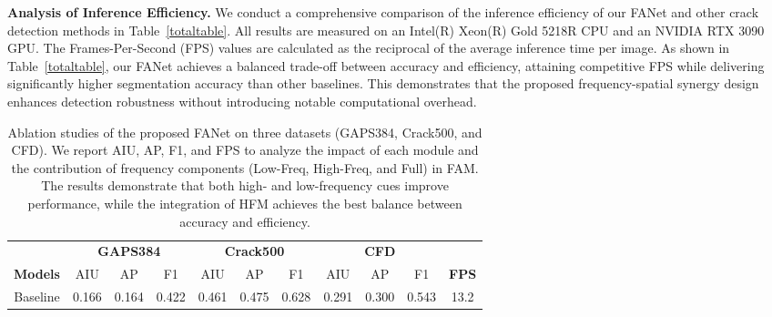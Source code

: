 \documentclass[journal]{IEEEtran}
\begin{document}
\textbf{Analysis of Inference Efficiency.}  
We conduct a comprehensive comparison of the inference efficiency of our FANet and other crack detection methods in Table~\ref{totaltable}.  
All results are measured on an Intel(R) Xeon(R) Gold 5218R CPU and an NVIDIA RTX 3090 GPU.  
The Frames-Per-Second (FPS) values are calculated as the reciprocal of the average inference time per image.  
As shown in Table~\ref{totaltable}, our FANet achieves a balanced trade-off between accuracy and efficiency, attaining competitive FPS while delivering significantly higher segmentation accuracy than other baselines.  
This demonstrates that the proposed frequency-spatial synergy design enhances detection robustness without introducing notable computational overhead.




\begin{table}[]
\centering
\caption{{Ablation studies of the proposed FANet on three datasets (GAPS384, Crack500, and CFD).
We report AIU, AP, F1, and FPS to analyze the impact of each module and the contribution of frequency components (Low-Freq, High-Freq, and Full) in FAM.
The results demonstrate that both high- and low-frequency cues improve performance, while the integration of HFM achieves the best balance between accuracy and efficiency.}}
\begin{tabular}{@{}c|ccc|ccc|ccc|c@{}}
\toprule
                                  & \multicolumn{3}{c|}{\textbf{GAPS384}}                                                      & \multicolumn{3}{c|}{\textbf{Crack500}}                                                     & \multicolumn{3}{c|}{\textbf{CFD}}                                                          &                                \\ \cmidrule(lr){2-10}
\multirow{-2}{*}{\textbf{Models}} & AIU                          & AP                           & F1                           & AIU                          & AP                           & F1                           & AIU                          & AP                           & F1                           & \multirow{-2}{*}{\textbf{FPS}} \\ \midrule
Baseline                          & 0.166                        & 0.164                        & 0.422                        & 0.461                        & 0.475                        & 0.628                        & 0.291                        & 0.300                          & 0.543                        & 13.2                           \\

\end{tabular}
\end{table}
\end{document}
